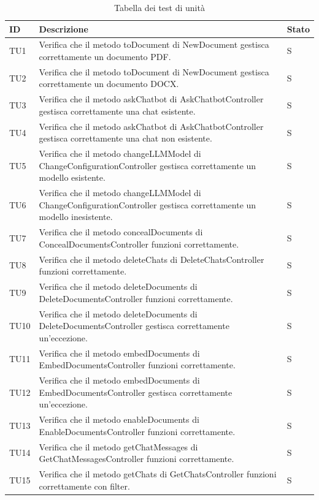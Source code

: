 \documentclass[10pt, a4paper]{article}
\begin{document}
\renewcommand{\arraystretch}{1.5}
\begin{xltabular}{\textwidth}{p{0.12\textwidth}|p{0.7\textwidth}|X}
\caption{Tabella dei test di unità}
\label{tab:test_test_unità}\\
\textbf{ID} & \textbf{Descrizione} & \textbf{Stato}  \\
\hline
TU1 & Verifica che il metodo toDocument di NewDocument gestisca correttamente un documento PDF. & S \\
\hline
TU2 & Verifica che il metodo toDocument di NewDocument gestisca correttamente un documento DOCX. & S \\
\hline
TU3 & Verifica che il metodo askChatbot di AskChatbotController gestisca correttamente una chat esistente. & S \\
\hline
TU4 & Verifica che il metodo askChatbot di AskChatbotController gestisca correttamente una chat non esistente. & S \\
\hline
TU5 & Verifica che il metodo changeLLMModel di ChangeConfigurationController gestisca correttamente un modello esistente. & S \\
\hline
TU6 & Verifica che il metodo changeLLMModel di ChangeConfigurationController gestisca correttamente un modello inesistente. & S \\
\hline
TU7 & Verifica che il metodo concealDocuments di ConcealDocumentsController funzioni correttamente. & S \\
\hline
TU8 & Verifica che il metodo deleteChats di DeleteChatsController funzioni correttamente. & S \\
\hline
TU9 & Verifica che il metodo deleteDocuments di DeleteDocumentsController funzioni correttamente. & S \\
\hline
TU10 & Verifica che il metodo deleteDocuments di DeleteDocumentsController gestisca correttamente un'eccezione. & S \\
\hline
TU11 & Verifica che il metodo embedDocuments di EmbedDocumentsController funzioni correttamente. & S \\
\hline
TU12 & Verifica che il metodo embedDocuments di EmbedDocumentsController gestisca correttamente un'eccezione. & S \\
\hline
TU13 & Verifica che il metodo enableDocuments di EnableDocumentsController funzioni correttamente. & S \\
\hline
TU14 & Verifica che il metodo getChatMessages di GetChatMessagesController funzioni correttamente. & S \\
\hline
TU15 & Verifica che il metodo getChats di GetChatsController funzioni correttamente con filter. & S \\

\end{xltabular}
\end{document}

